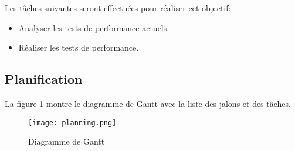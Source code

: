 Les tâches suivantes seront effectuées pour réaliser cet objectif:
\begin{itemize}
    \item Analyser les tests de performance actuels.
    \item Réaliser les tests de performance.
\end{itemize}

\begin{landscape}
\section{Planification}
La figure \ref{fig:gantt} montre le diagramme de Gantt avec la liste des jalons et des tâches.
\begin{figure}[h!]
   \centering
    \texttt{[image: planning.png]}
    \caption{Diagramme de Gantt}
    \label{fig:gantt}
\end{figure}

\end{landscape} 